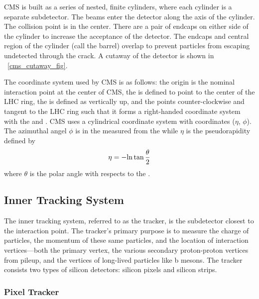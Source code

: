 CMS is built as a series of nested, finite cylinders, where each cylinder is a
separate subdetector. The beams enter the detector along the axis of the
cylinder. The collision point is in the center. There are a pair of endcaps on
either side of the cylinder to increase the acceptance of the detector. The
endcaps and central region of the cylinder (call the barrel) overlap to prevent
particles from escaping undetected through the crack. A cutaway of the detector
is shown in \FIG~\ref{cms_cutaway_fig}.

The coordinate system used by CMS is as follows: the origin is the nominal
interaction point at the center of CMS, the \xaxis is defined to point to the
center of the LHC ring, the \yaxis is defined as vertically up, and the \zaxis
points counter-clockwise and tangent to the LHC ring such that it forms a
right-handed coordinate system with the \xaxis and \yaxis. CMS uses a
cylindrical coordinate system with coordinates ($\eta$, $\phi$). The azimuthal
angel $\phi$ is in the \xyplane measured from the \xaxis while $\eta$ is the
pseudorapidity defined by
\begin{equation}
    \eta = -{\mathrm{ln}} \tan \frac{\theta}{2}
\end{equation}
where $\theta$ is the polar angle with respects to the \zaxis.

\subsection{Inner Tracking System}


The inner tracking system, referred to as the tracker, is the subdetector
closest to the interaction point. The tracker's primary purpose is to measure
the charge of particles, the momentum of these same particles, and the location
of interaction vertices---both the primary vertex, the various secondary
proton-proton vertices from pileup, and the vertices of long-lived particles
like b mesons. The tracker consists two types of silicon detectors: silicon
pixels and silicon strips.

\subsubsection{Pixel Tracker}

